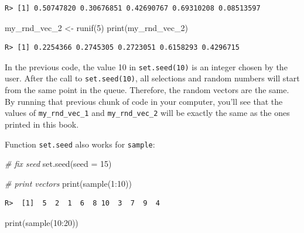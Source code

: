 \documentclass[
  12pt,
]{book}
\newenvironment{Shaded}{\begin{snugshade}}{\end{snugshade}}
\newcommand{\AttributeTok}[1]{\textcolor[rgb]{0.61,0.61,0.61}{#1}}
\newcommand{\CommentTok}[1]{\textcolor[rgb]{0.37,0.37,0.37}{\textit{#1}}}
\newcommand{\DecValTok}[1]{\textcolor[rgb]{0.06,0.06,0.06}{#1}}
\newcommand{\FunctionTok}[1]{\textcolor[rgb]{0,0,0}{#1}}
\newcommand{\NormalTok}[1]{#1}
\newcommand{\OtherTok}[1]{\textcolor[rgb]{0.37,0.37,0.37}{#1}}
\newcommand{\SpecialCharTok}[1]{\textcolor[rgb]{0,0,0}{#1}}
\begin{document}
\begin{verbatim}
R> [1] 0.50747820 0.30676851 0.42690767 0.69310208 0.08513597
\end{verbatim}

\begin{Shaded}
\begin{Highlighting}[]
\NormalTok{my\_rnd\_vec\_2 }\OtherTok{\textless{}{-}} \FunctionTok{runif}\NormalTok{(}\DecValTok{5}\NormalTok{)}
\FunctionTok{print}\NormalTok{(my\_rnd\_vec\_2)}
\end{Highlighting}
\end{Shaded}

\begin{verbatim}
R> [1] 0.2254366 0.2745305 0.2723051 0.6158293 0.4296715
\end{verbatim}

In the previous code, the value 10 in \texttt{set.seed(10)} is an integer chosen by the user. After the call to \texttt{set.seed(10)}, all selections and random numbers will start from the same point in the queue. Therefore, the random vectors are the same. By running that previous chunk of code in your computer, you'll see that the values of \texttt{my\_rnd\_vec\_1} and \texttt{my\_rnd\_vec\_2} will be exactly the same as the ones printed in this book.

Function \texttt{set.seed} also works for \texttt{sample}:

\begin{Shaded}
\begin{Highlighting}[]
\CommentTok{\# fix seed}
\FunctionTok{set.seed}\NormalTok{(}\AttributeTok{seed =} \DecValTok{15}\NormalTok{)}

\CommentTok{\# print vectors}
\FunctionTok{print}\NormalTok{(}\FunctionTok{sample}\NormalTok{(}\DecValTok{1}\SpecialCharTok{:}\DecValTok{10}\NormalTok{))}
\end{Highlighting}
\end{Shaded}

\begin{verbatim}
R>  [1]  5  2  1  6  8 10  3  7  9  4
\end{verbatim}

\begin{Shaded}
\begin{Highlighting}[]
\FunctionTok{print}\NormalTok{(}\FunctionTok{sample}\NormalTok{(}\DecValTok{10}\SpecialCharTok{:}\DecValTok{20}\NormalTok{))}
\end{Highlighting}
\end{Shaded}
\end{document}
